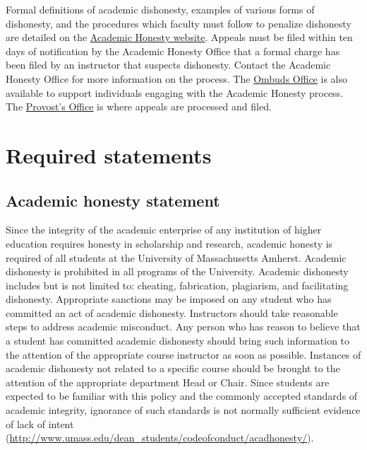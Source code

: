 \documentclass[11pt]{article}
\begin{document}
Formal definitions of academic dishonesty, examples of various forms of
dishonesty, and the procedures which faculty must follow to penalize dishonesty
are detailed on the \href{https://www.umass.edu/studentsuccess/academic-integrity}{Academic Honesty website}. Appeals must be filed within ten
days of notification by the Academic Honesty Office that a formal charge has
been filed by an instructor that suspects dishonesty. Contact the Academic
Honesty Office for more information on the process. The \href{https://www.umass.edu/ombuds/}{Ombuds Office} is also
available to support individuals engaging with the Academic Honesty process.
The \href{https://www.umass.edu/provost/}{Provost’s Office} is where appeals are processed and filed.

\section*{Required statements}
\label{sec:org69dbaf4}
\subsection*{Academic honesty statement}
\label{sec:org37d9b56}
Since the integrity of the academic enterprise of any institution of higher
education requires honesty in scholarship and research, academic honesty is
required of all students at the University of Massachusetts Amherst. Academic
dishonesty is prohibited in all programs of the University. Academic dishonesty
includes but is not limited to: cheating, fabrication, plagiarism, and
facilitating dishonesty. Appropriate sanctions may be imposed on any student
who has committed an act of academic dishonesty. Instructors should take
reasonable steps to address academic misconduct. Any person who has reason to
believe that a student has committed academic dishonesty should bring such
information to the attention of the appropriate course instructor as soon as
possible. Instances of academic dishonesty not related to a specific course
should be brought to the attention of the appropriate department Head or Chair.
Since students are expected to be familiar with this policy and the commonly
accepted standards of academic integrity, ignorance of such standards is not
normally sufficient evidence of lack of intent
(\url{http://www.umass.edu/dean\_students/codeofconduct/acadhonesty/}).
\end{document}
